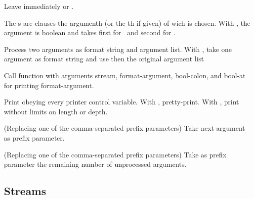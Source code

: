 \begin{LIST}{1cm}
\begin{LIST}{.5cm}
    \IT{\KWD{\TLD\^{}}}
    {
    Leave immediately \kwd{\TLD\boldmath{$<$}} or \kwd{\TLD\boldmath{$\{$}}.
  }

    {
    The s are clauses the argumenth (or the th if given) of wich is chosen. With
    \kwd{:}, the argument is boolean and takes first  for \NIL\ and
    second  for \T.
  }

    {
    Process two arguments as format string and argument list. With
    , take one argument as format string and use then the
    original argument list
  }

    {
    Call function  with arguments stream, format-argument,
    bool-colon, and bool-at for printing format-argument.
  }

    {
    Print obeying every printer control variable. With \kwd{:},
    pretty-print. With , print without limits on length or depth.
  }

    {
    (Replacing one of the comma-separated prefix parameters) Take next
    argument as prefix parameter.
  }

    \IT{\KWD{\#}}
    {
    (Replacing one of the comma-separated prefix parameters) Take as
    prefix parameter the remaining number of unprocessed arguments.
  }

  \end{LIST}

\end{LIST}


\subsection{Streams} 

